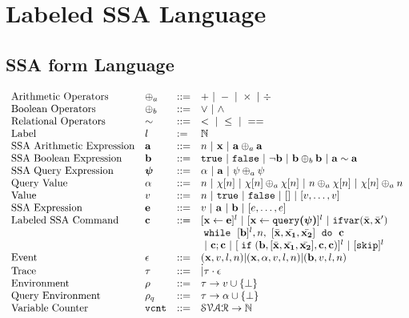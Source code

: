 \section{Labeled SSA Language}
%
%
\subsection{SSA form Language}
\[
\begin{array}{llll}
 \mbox{Arithmetic Operators} 
& \oplus_a & ::= & + ~|~ - ~|~ \times 
%
~|~ \div \\  
\mbox{Boolean Operators} 
& \oplus_b & ::= & \lor ~|~ \land
\\
\mbox{Relational Operators} 
& \sim & ::= & < ~|~ \leq ~|~ == 
\\  
%
\mbox{Label} 
& l & := & \mathbb{N} 
\\ 
%
\mbox{SSA Arithmetic Expression} 
& \saexpr & ::= & 
n ~|~ \ssa{x} ~|~ \saexpr \oplus_a \saexpr  
\\
%
\mbox{SSA Boolean Expression} & \sbexpr & ::= & 
	\etrue ~|~ \efalse  ~|~ \neg \sbexpr
	 ~|~ \sbexpr \oplus_b \sbexpr
	~|~ \saexpr \sim \saexpr 
	\\
%
\mbox{SSA Query Expression} 
& \ssa{\qexpr} & ::= 
& { \qval ~|~ \saexpr ~|~ \qexpr \oplus_a \qexpr} 
\\
%
\mbox{Query Value} & \qval & ::= 
& {n ~|~ \chi[n] ~|~ \chi[n] \oplus_a  \chi[n] ~|~ n \oplus_a  \chi[n]
~|~ \chi[n] \oplus_a  n}
\\
%
\mbox{Value} 
& v & ::= & { n \sep \etrue \sep \efalse ~|~ [] ~|~ [v, \dots, v]}  
\\
%
\mbox{SSA Expression} & \sexpr & ::= & v ~|~ \saexpr \sep \sbexpr ~|~ [\expr, \dots, \expr]
\\	
%
\mbox{Labeled SSA Command} 
& \ssa{c} & ::= &   [\assign {\ssa{x}}{ \ssa{\expr}}]^{l} ~|~  [\assign {\ssa{x} } {\ssa{\query(\qexpr)}}]^{l}
%
~|~  {{\eifvar(\bar{\ssa{x}}, \bar{\ssa{x}}')}} 
%
\\ 
&&& 
{\ewhile ~ [ \sbexpr ]^{l} , n,
~ 
[\bar{\ssa{x}}, \bar{\ssa{x_1}}, \bar{\ssa{x_2}}] 
~ \edo ~  \ssa{c} }
\\
&&&
~|~ \ssa{c};\ssa{c}  
~|~ [\eif(\sbexpr, [\bar{\ssa{x}}, \bar{\ssa{x_1}}, \bar{\ssa{x_2}}] , \ssa{c}, \ssa{c})]^l 
~|~ [\eskip]^{l} 
\\
%
\mbox{Event} 
& \event & ::= & (\ssa{x}, v, l, n) | (\ssa{x}, \qval, v, l, n) | (\sbexpr, v, l, n)
\\
%
\mbox{Trace} & \vtrace
& ::= & \dot | \vtrace \cdot \event
\\
%
\mbox{Environment} 
& \env & ::= & \vtrace \to v \cup \{\bot\}
\\
%
\mbox{Query Environment} 
& \qenv & ::= & \vtrace \to \qval \cup \{\bot\}
\\
%
\mbox{Variable Counter} & \vcounter
& ::= & \mathcal{SVAR} \to \mathbb{N}
\end{array}
\]
